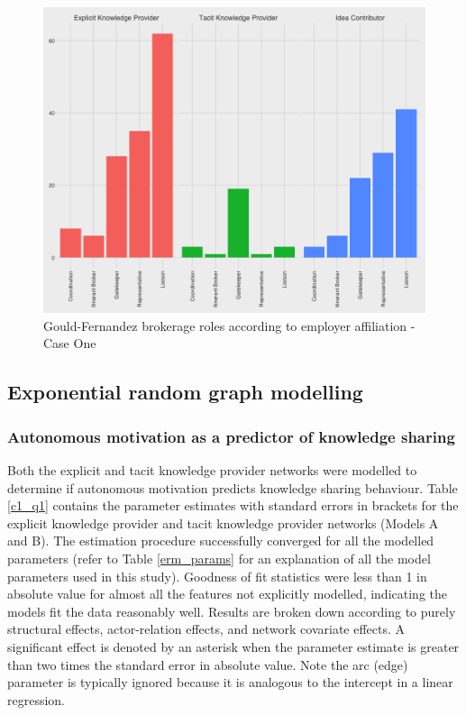 \begin{figure}
	\centering
	\includegraphics[width=0.7\linewidth]{Images/gf_brokerage_case1}
	\caption{Gould-Fernandez brokerage roles according to employer affiliation - Case One}
	\label{fig:gfbrokeragecase1}
\end{figure}


\subsection{Exponential random graph modelling}

\subsubsection{Autonomous motivation as a predictor of knowledge sharing}

Both the explicit and tacit knowledge provider networks were modelled to determine if autonomous motivation predicts knowledge sharing behaviour. Table \ref{c1_q1} contains the parameter estimates with standard errors in brackets for the explicit knowledge provider and tacit knowledge provider networks (Models A and B). The estimation procedure successfully converged for all the modelled parameters (refer to Table \ref{erm_params} for an explanation of all the model parameters used in this study). Goodness of fit statistics were less than 1 in absolute value for almost all the features not explicitly modelled, indicating the models fit the data reasonably well. Results are broken down according to purely structural effects, actor-relation effects, and network covariate effects. A significant effect is denoted by an asterisk when the parameter estimate is greater than two times the standard error in absolute value. Note the arc (edge) parameter is typically ignored because it is analogous to the intercept in a linear regression.\medskip

